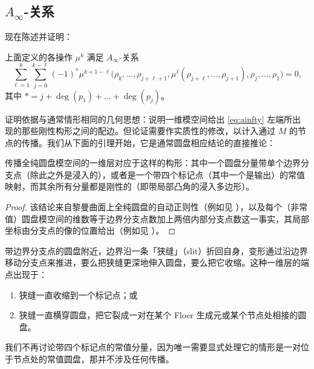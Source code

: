 \subsection{$A_\infty$-关系}\label{ss:relations}

现在陈述并证明：

\begin{theo}\label{thm:ainfty}
上面定义的各操作 $\mu^k$ 满足 $A_\infty$-关系
\begin{equation}\label{eq:ainfty}
\sum_{\ell=1}^{k}\sum_{j=0}^{k-\ell} (-1)^* \mu^{k+1-\ell}\bigl(\rho_k,\dots,
\rho_{j+\ell+1},\mu^\ell(\rho_{j+\ell},\dots,\rho_{j+1}),\rho_j,\dots,\rho_1\bigr)=0,
\end{equation}
其中 $*=j+\deg(p_1)+\dots+\deg(p_j)$。
\end{theo}

证明依据与通常情形相同的几何思想：说明一维模空间给出 \eqref{eq:ainfty} 左端所出现的那些刚性构形之间的配边。但论证需要作实质性的修改，以计入通过 $M$ 的节点的传播。我们从下面的引理开始，它是通常圆盘相应结论的直接推论：

\begin{lemma}\label{l:localslit}
传播全纯圆盘模空间的一维层对应于这样的构形：其中一个圆盘分量带单个边界分支点（除此之外是浸入的），或者是一个带四个标记点（其中一个是输出）的常值映射，而其余所有分量都是刚性的（即带局部凸角的浸入多边形）。
\end{lemma}

\begin{proof}
该结论来自黎曼曲面上全纯圆盘的自动正则性（例如见 \cite[\S13]{SeBook}），以及每个（非常值）圆盘模空间的维数等于边界分支点数加上两倍内部分支点数这一事实，其局部坐标由分支点的像的位置给出（例如见 \cite[Proposition 7.8]{ENS}）。
\end{proof}

带边界分支点的圆盘附近，边界沿一条「狭缝」（slit）折回自身，变形通过沿边界移动分支点来推进，要么把狭缝更深地伸入圆盘，要么把它收缩。这种一维层的端点出现于：
\begin{enumerate}
\item[(i)] 狭缝一直收缩到一个标记点；或
\item[(ii)] 狭缝一直横穿圆盘，把它裂成一对在某个 Floer 生成元或某个节点处相接的圆盘。
\end{enumerate}

我们不再讨论带四个标记点的常值分量，因为唯一需要显式处理它的情形是一对位于节点处的常值圆盘，那并不涉及任何传播。


